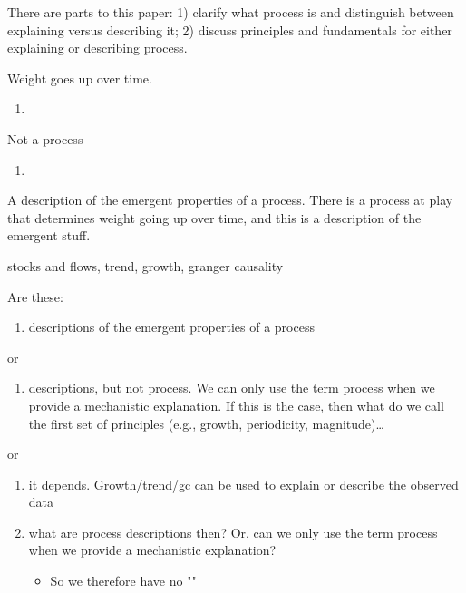 \documentclass[english,,man]{apa6}
\providecommand{\tightlist}{%
  \setlength{\itemsep}{0pt}\setlength{\parskip}{0pt}}
\theoremstyle{definition}
\theoremstyle{definition}
\theoremstyle{definition}
\theoremstyle{remark}
\begin{document}
There are parts to this paper: 1) clarify what process is and
distinguish between explaining versus describing it; 2) discuss
principles and fundamentals for either explaining or describing process.

Weight goes up over time.

\begin{enumerate}
\def\labelenumi{\arabic{enumi})}
\item
\end{enumerate}

Not a process

\begin{enumerate}
\def\labelenumi{\arabic{enumi})}
\setcounter{enumi}{1}
\item
\end{enumerate}

A description of the emergent properties of a process. There is a
process at play that determines weight going up over time, and this is a
description of the emergent stuff.

stocks and flows, trend, growth, granger causality

Are these:

\begin{enumerate}
\def\labelenumi{\arabic{enumi})}
\tightlist
\item
  descriptions of the emergent properties of a process
\end{enumerate}

or

\begin{enumerate}
\def\labelenumi{\arabic{enumi})}
\setcounter{enumi}{1}
\tightlist
\item
  descriptions, but not process. We can only use the term process when
  we provide a mechanistic explanation. If this is the case, then what
  do we call the first set of principles (e.g., growth, periodicity,
  magnitude)\ldots{}
\end{enumerate}

or

\begin{enumerate}
\def\labelenumi{\arabic{enumi})}
\setcounter{enumi}{2}
\item
  it depends. Growth/trend/gc can be used to explain or describe the
  observed data
\item
  what are process descriptions then? Or, can we only use the term
  process when we provide a mechanistic explanation?

  \begin{itemize}
  \tightlist
  \item
    So we therefore have no ""
  \end{itemize}
\end{enumerate}
\end{document}

